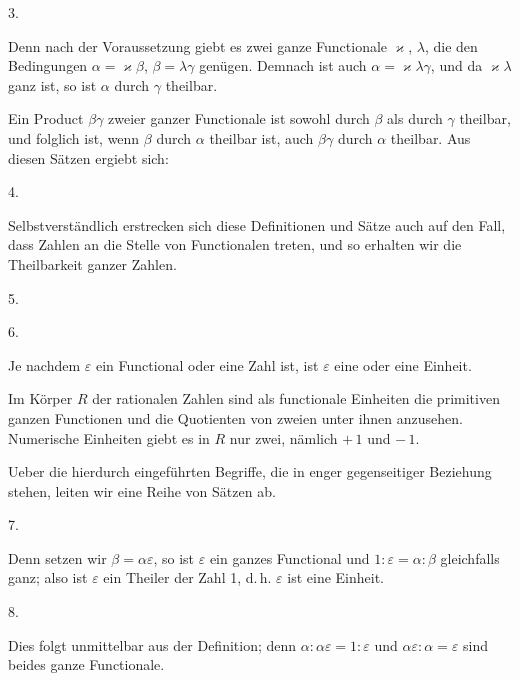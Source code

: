 
3. 

Denn nach der Voraussetzung giebt es zwei ganze Functionale $\varkappa$, $\lambda$, die
den Bedingungen $\alpha = \varkappa\beta$, $\beta = \lambda\gamma$ genügen. Demnach ist
auch $\alpha = \varkappa\lambda\gamma$, und da $\varkappa\lambda$ ganz ist, so ist
$\alpha$ durch $\gamma$ theilbar.

Ein Product $\beta\gamma$ zweier ganzer Functionale ist sowohl durch $\beta$ als durch
$\gamma$ theilbar, und folglich ist, wenn $\beta$ durch $\alpha$ theilbar ist, auch
$\beta\gamma$ durch $\alpha$ theilbar. Aus diesen Sätzen ergiebt sich:

4. 

Selbstverständlich erstrecken sich diese Definitionen und Sätze auch auf den Fall, dass
Zahlen an die Stelle von Functionalen treten, und so erhalten wir die Theilbarkeit
ganzer Zahlen.

5. 

6. 

Je nachdem $\varepsilon$ ein Functional oder eine Zahl ist, ist $\varepsilon$ eine
 oder eine  Einheit.

Im Körper $R$ der rationalen Zahlen sind als functionale Einheiten die primitiven
ganzen Functionen und die Quotienten von zweien unter ihnen anzusehen. Numerische
Einheiten giebt es in $R$ nur zwei, nämlich $+\,1$ und $-\,1$.

Ueber die hierdurch eingeführten Begriffe, die in enger gegenseitiger Beziehung
stehen, leiten wir eine Reihe von Sätzen ab.

7. 

Denn setzen wir $\beta = \alpha\varepsilon$, so ist $\varepsilon$ ein ganzes
Functional und $1 : \varepsilon = \alpha : \beta$ gleichfalls ganz; also ist
$\varepsilon$ ein Theiler der Zahl 1, d.\,h. $\varepsilon$ ist eine Einheit.

8. 

Dies folgt unmittelbar aus der Definition; denn $\alpha : \alpha\varepsilon =
1 : \varepsilon$ und $\alpha\varepsilon : \alpha = \varepsilon$ sind beides ganze
Functionale.
